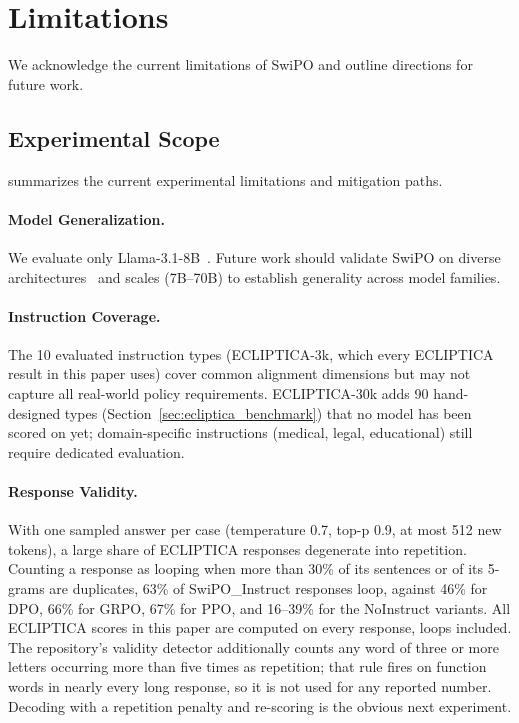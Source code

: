 
\section{Limitations}
\label{sec:limitations}

We acknowledge the current limitations of SwiPO and outline directions for future work.

\vspace{-2mm}
\subsection{Experimental Scope}
\label{sec:experimental_scope}

\noindent {} summarizes the current experimental limitations and mitigation paths.

\paragraph{Model Generalization.} We evaluate only Llama-3.1-8B~\cite{dubey2024llama}. Future work should validate SwiPO on diverse architectures~\cite{jiang2023mistral,zhang2022opt,openai2023gpt4} and scales (7B--70B) to establish generality across model families.

\paragraph{Instruction Coverage.} The 10 evaluated instruction types (ECLIPTICA-3k, which every ECLIPTICA result in this paper uses) cover common alignment dimensions but may not capture all real-world policy requirements. ECLIPTICA-30k adds 90 hand-designed types (Section~\ref{sec:ecliptica_benchmark}) that no model has been scored on yet; domain-specific instructions (medical, legal, educational) still require dedicated evaluation.

\paragraph{Response Validity.} With one sampled answer per case (temperature 0.7, top-p 0.9, at most 512 new tokens), a large share of ECLIPTICA responses degenerate into repetition. Counting a response as looping when more than 30\% of its sentences or of its 5-grams are duplicates, 63\% of SwiPO\_Instruct responses loop, against 46\% for DPO, 66\% for GRPO, 67\% for PPO, and 16--39\% for the NoInstruct variants. All ECLIPTICA scores in this paper are computed on every response, loops included. The repository's validity detector additionally counts any word of three or more letters occurring more than five times as repetition; that rule fires on function words in nearly every long response, so it is not used for any reported number. Decoding with a repetition penalty and re-scoring is the obvious next experiment.

